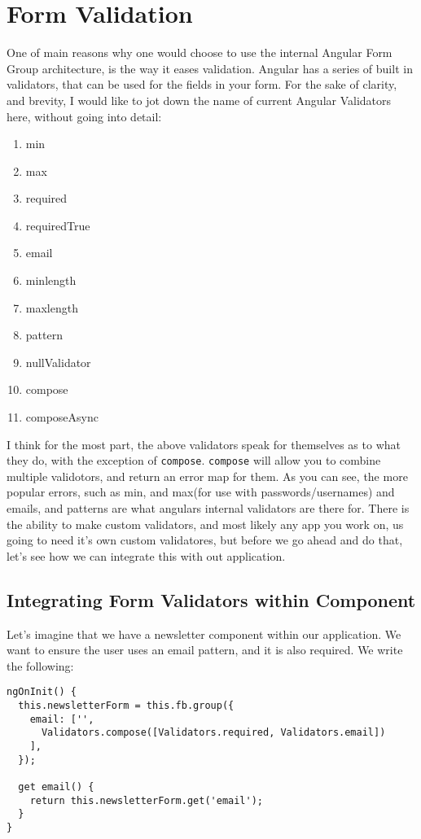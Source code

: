 \chapter{ Form Validation }

One of main reasons why one would choose to use the internal Angular Form 
Group architecture, is the way it eases validation. Angular has a series 
of built in validators, that can be used for the fields in your form. For 
the sake of clarity, and brevity, I would like to jot down the name of current 
Angular Validators here, without going into detail: 
\begin{enumerate}
  \item min
  \item max
  \item required
  \item requiredTrue
  \item email
  \item minlength
  \item maxlength
  \item pattern
  \item nullValidator
  \item compose
  \item composeAsync
\end{enumerate}

I think for the most part, the above validators speak for themselves as to 
what they do, with the exception of \lstinline{compose}. \lstinline{compose}
will allow you to combine multiple validotors, and return an error map for 
them. As you can see, the more popular errors, such as min, and max(for use
with passwords/usernames) and emails, and patterns are what angulars internal 
validators are there for. There is the ability to make custom validators, and 
most likely any app you work on, us going to need it's own custom validatores,
but before we go ahead and do that, let's see how we can integrate this with
out application. 

\section{Integrating Form Validators within Component}
Let's imagine that we have a newsletter component within our application. We 
want to ensure the user uses an email pattern, and it is also required. We write 
the following: 
\begin{lstlisting}
ngOnInit() {
  this.newsletterForm = this.fb.group({
    email: ['',
      Validators.compose([Validators.required, Validators.email])
    ],
  });

  get email() {
    return this.newsletterForm.get('email');
  }
}
\end{lstlisting}

